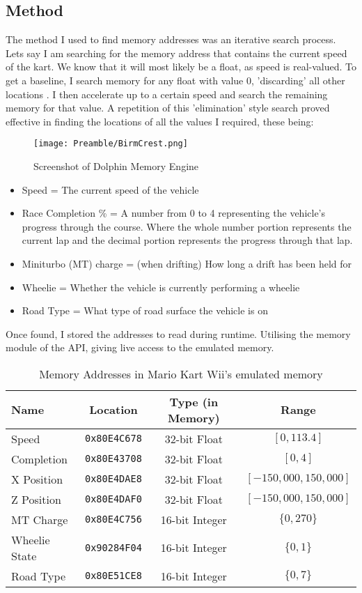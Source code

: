 \subsection{Method}
The method I used to find memory addresses was an iterative search process. Lets say I am searching for the memory address that contains the current speed of the kart. We know that it will most likely be a float, as speed is real-valued. To get a baseline, I search memory for any float with value 0, 'discarding' all other locations . I then accelerate up to a certain speed and search the remaining memory for that value. A repetition of this 'elimination' style search proved effective in finding the locations of all the values I required, these being:
\begin{figure}[bt]
    \centering
    \texttt{[image: Preamble/BirmCrest.png]}
    \caption{Screenshot of Dolphin Memory Engine}
    \label{fig:dme}
\end{figure}
\begin{itemize}
    \item Speed = The current speed of the vehicle
    \item Race Completion \% = A number from 0 to 4 representing the vehicle's progress through the course. Where the whole number portion represents the current lap and the decimal portion represents the progress through that lap.
    \item Miniturbo (MT) charge = (when drifting) How long a drift has been held for
    \item Wheelie = Whether the vehicle is currently performing a wheelie
    \item Road Type = What type of road surface the vehicle is on
\end{itemize}
Once found, I stored the addresses to read during runtime. Utilising the memory module of the API, giving live access to the emulated memory.
\begin{table}[b]
    \centering
    \begin{tabular}{l|c|c|c}
    \textbf{Name}  & \textbf{Location} & \textbf{Type (in Memory)} & \textbf{Range}\\
    \hline
     Speed  &        \texttt{0x80E4C678} & 32-bit Float  & $$[0, 113.4]$$\\
     Completion  &   \texttt{0x80E43708} & 32-bit Float  & $$[0, 4] $$\\
     X Position  &   \texttt{0x80E4DAE8} & 32-bit Float  & $$[-150,000, 150,000] $$\\
     Z Position  &   \texttt{0x80E4DAF0} & 32-bit Float  & $$[-150,000, 150,000] $$\\
     MT Charge &     \texttt{0x80E4C756} & 16-bit Integer& $$\{0,270\}$$\\
     Wheelie State & \texttt{0x90284F04} & 16-bit Integer& $$\{0,1\}$$\\
     Road Type &     \texttt{0x80E51CE8} & 16-bit Integer& $$ \{0,7\} $$\\
    \end{tabular}
    \caption{Memory Addresses in Mario Kart Wii's emulated memory}
    \label{tab:memory-addresses}
\end{table}